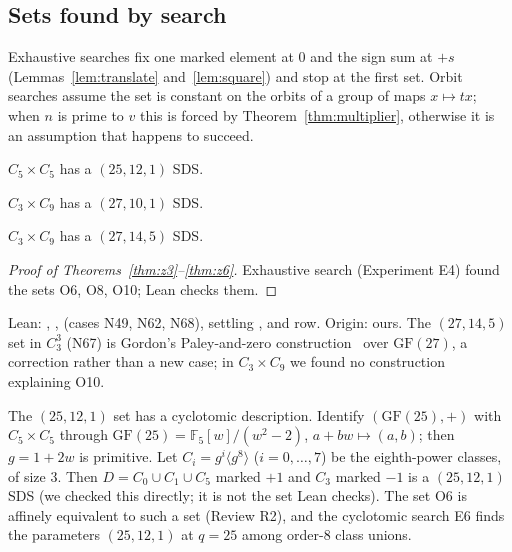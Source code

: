 \subsection{Sets found by search}

Exhaustive searches fix one marked element at $0$ and the sign sum at $+s$
(Lemmas~\ref{lem:translate} and~\ref{lem:square}) and stop at the first set. Orbit searches
assume the set is constant on the orbits of a group of maps $x \mapsto tx$; when $n$ is prime to
$v$ this is forced by Theorem~\ref{thm:multiplier}, otherwise it is an assumption that
happens to succeed.

\begin{theorem}\label{thm:z3}
$C_5 \times C_5$ has a $(25, 12, 1)$ SDS.
\end{theorem}

\begin{theorem}\label{thm:z5}
$C_3 \times C_9$ has a $(27, 10, 1)$ SDS.
\end{theorem}

\begin{theorem}\label{thm:z6}
$C_3 \times C_9$ has a $(27, 14, 5)$ SDS.
\end{theorem}

\begin{proof}[Proof of Theorems~\ref{thm:z3}--\ref{thm:z6}]
Exhaustive search (Experiment E4) found the sets O6, O8, O10; Lean checks them.
\end{proof}

\begin{remark}
Lean: , ,  (cases
N49, N62, N68), settling ,  and  row. Origin: ours. The $(27, 14, 5)$ set
in $C_3^3$ (N67) is Gordon's Paley-and-zero construction~\cite[Prop.~2.3]{gordon} over
$\mathrm{GF}(27)$, a correction rather than a new case; in $C_3 \times C_9$ we found no
construction explaining O10.
\end{remark}

The $(25, 12, 1)$ set has a cyclotomic description. Identify $(\mathrm{GF}(25), +)$ with
$C_5 \times C_5$ through $\mathrm{GF}(25) = \mathbb{F}_5[w]/(w^2 - 2)$, $a + bw \mapsto (a, b)$;
then $g = 1 + 2w$ is primitive. Let $C_i = g^i\langle g^8\rangle$ ($i = 0, \dots, 7$) be the
eighth-power classes, of size $3$. Then $D = C_0 \cup C_1 \cup C_5$ marked $+1$ and $C_3$ marked
$-1$ is a $(25, 12, 1)$ SDS (we checked this directly; it is not the set Lean checks). The set
O6 is affinely equivalent to such a set (Review R2), and the cyclotomic search E6 finds the
parameters $(25, 12, 1)$ at $q = 25$ among order-$8$ class unions.

